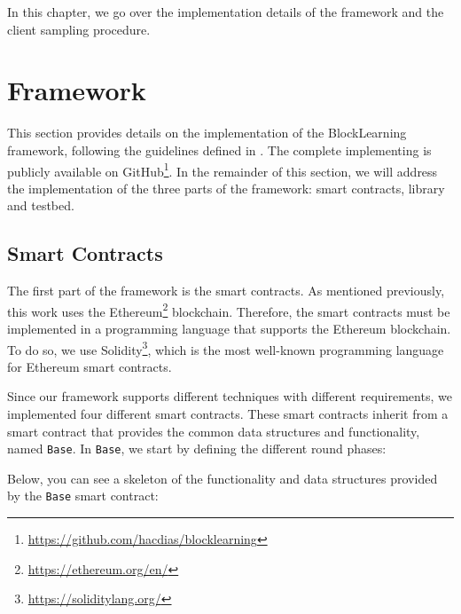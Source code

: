 \todo{}

In this chapter, we go over the implementation details of the framework and the client sampling procedure.

\section{Framework}

This section provides details on the implementation of the BlockLearning framework, following the guidelines defined in . The complete implementing is publicly available on GitHub\footnote{\url{https://github.com/hacdias/blocklearning}}. In the remainder of this section, we will address the implementation of the three parts of the framework: smart contracts, library and testbed.

\subsection{Smart Contracts}

The first part of the framework is the smart contracts. As mentioned previously, this work uses the Ethereum\footnote{\url{https://ethereum.org/en/}} blockchain. Therefore, the smart contracts must be implemented in a programming language that supports the Ethereum blockchain. To do so, we use Solidity\footnote{\url{https://soliditylang.org/}}, which is the most well-known programming language for Ethereum smart contracts.

Since our framework supports different techniques with different requirements, we implemented four different smart contracts. These smart contracts inherit from a smart contract that provides the common data structures and functionality, named \texttt{Base}. In \texttt{Base}, we start by defining the different round phases:




Below, you can see a skeleton of the functionality and data structures provided by the \texttt{Base} smart contract:

    
